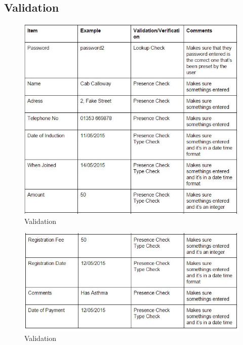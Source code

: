 \begin{itemize}
\section{Validation}

\begin{figure}[H]
    \includegraphics[width=\textwidth]{Validation1.JPG}
    \caption{Validation} \label{fig:Valdation}
\end{figure}

\begin{figure}[H]
    \includegraphics[width=\textwidth]{Validation2.JPG}
    \caption{Validation} \label{fig:Valdation}
\end{figure}


\end{itemize}
